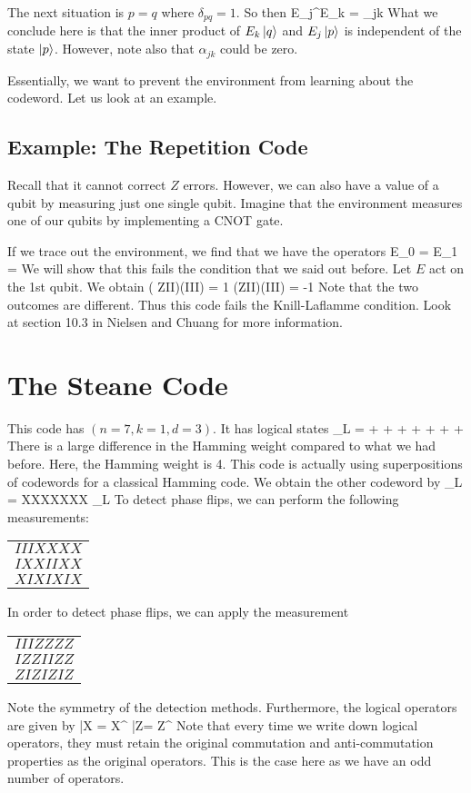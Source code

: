 The next situation is $p = q$ where $\delta_{pq} = 1$. So then 
\beq
{} E_j^\dagger E_k  = \alpha_{jk}
\eeq
What we conclude here is that the inner product of $E_k \ket{q}$ and $E_j \ket{p}$ is independent of the state $\ket{p}$. However, note also that $\alpha_{jk}$ could be zero. 

Essentially, we want to prevent the environment from learning about the codeword. Let us look at an example. 

\subsection{Example: The Repetition Code}
Recall that it cannot correct $Z$ errors. However, we can also have a value of a qubit by measuring just one single qubit. 
Imagine that the environment measures one of our qubits by implementing a CNOT gate. 

If we trace out the environment, we find that we have the operators
\beq
E_0 = 
\eeq
\beq
E_1 = 
\eeq
We will show that this fails the condition that we said out before. Let $E$ act on the 1st qubit. We obtain
\beq
{} ( ZII)(III) = 1
\eeq
\beq
{} (ZII)(III)  = -1
\eeq
Note that the two outcomes are different. Thus this code fails the Knill-Laflamme condition. Look at section 10.3 in Nielsen and Chuang for more information. 

\section{The Steane Code}
This code has $(n = 7, k= 1, d = 3)$. It has logical states
\beq
{}_L =  +  +  +  +  +  +  + 
\eeq
There is a large difference in the Hamming weight compared to what we had before. Here, the Hamming weight is 4. This code is actually using superpositions of codewords for a classical Hamming code. We obtain the other codeword by 
\beq
{}_L = XXXXXXX _L
\eeq
To detect phase flips, we can perform the following measurements:
\begin{tabular}{c}
$IIIXXXX$ \\
$IXXIIXX$ \\
$XIXIXIX$
\end{tabular}

In order to detect phase flips, we can apply the measurement
\begin{tabular}{c}
$IIIZZZZ$ \\
$IZZIIZZ$ \\
$ZIZIZIZ$
\end{tabular}
Note the symmetry of the detection methods. Furthermore,  the logical operators are given by
\beq
\bar{X} = X^{}
\eeq
\beq
\bar{Z}= Z^{}
\eeq
Note that every time we write down logical operators, they must retain the original commutation and anti-commutation properties as the original operators. This is the case here as we have an odd number of operators. 

